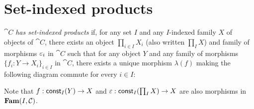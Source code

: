 \section{Set-indexed products}
\label{sec:set-indexed-product}

$\cat{C}$ \emph{has set-indexed products} if, for any set $I$ and any $I$-indexed family $X$ of objects of
$\cat{C}$, there exists an object $\prod_{i \in I}X_i$ (also written $\prod_{I} X$) and family of morphisms
$\varepsilon_i$ in $\cat{C}$ such that for any object $Y$ and any family of morphisms $\{f_i: Y \to X_i\}_{i \in I}$
in $\cat{C}$, there exists a unique morphism $\lambda(f)$ making the following diagram commute for every $i
\in I$:

\begin{center}
\end{center}

Note that $f: \mathsf{const}_{I}(Y) \to X$ and $\varepsilon: \mathsf{const}_{I}(\prod_{I} X) \to X$ are also morphisms in $\mathbf{Fam}(I,\mathcal{C})$.
